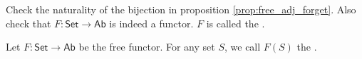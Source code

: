 \begin{exercise}
	Check the naturality of the bijection in proposition \ref{prop:free_adj_forget}. Also check that $F : \mathsf{Set} \to \mathsf{Ab}$ is indeed a functor. $F$ is called the .	
\end{exercise}

\begin{definition}
	Let $F : \mathsf{Set} \to \mathsf{Ab}$ be the free functor. For any set $S$, we call $F(S)$ the .
\end{definition}
